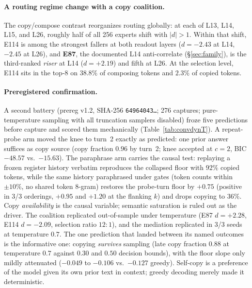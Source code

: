 \documentclass[10pt,a4paper,twocolumn]{article}
\begin{document}
\paragraph{A routing regime change with a copy coalition.}
The copy/compose contrast reorganizes routing globally: at each of L13, L14,
L15, and L26, roughly half of all 256 experts shift with $|d|{>}1$. Within that
shift, E114 is among the strongest fallers at both readout layers
($d{=}-2.43$ at L14, $-2.45$ at L26), and \textbf{E87}, the documented L14
anti-correlate (\S\ref{sec:family}), is the third-ranked \emph{riser} at L14 ($d{=}+2.19$) and
fifth at L26. At the selection level, E114 sits in the top-8 on $38.8\%$ of
composing tokens and $2.3\%$ of copied tokens.

\paragraph{Preregistered confirmation.}
A second battery (prereg v1.2, SHA-256 \texttt{64964043\ldots}; 276 captures;
pure-temperature sampling with all truncation samplers disabled) froze five
predictions before capture and scored them mechanically
(Table~\ref{tab:convdynT}). A repeat-probe arm moved the knee to turn~2 exactly
as predicted: one prior answer suffices as copy source (copy fraction $0.96$ by
turn~2; knee accepted at $c{=}2$, BIC $-48.57$ vs.\ $-15.63$). The paraphrase
arm carries the causal test: replaying a frozen register history verbatim
reproduces the collapsed floor with $92\%$ copied tokens, while the same
history paraphrased under gates (token counts within $\pm 10\%$, no shared
token 8-gram) restores the probe-turn floor by $+0.75$ (positive in 3/3
orderings, $+0.95$ and $+1.20$ at the flanking $k$) and drops copying to
$36\%$. Copy \emph{availability} is the causal variable; semantic saturation
is ruled out as the driver. The coalition replicated out-of-sample under
temperature (E87 $d{=}+2.28$, E114 $d{=}-2.09$, selection ratio $12{:}1$), and
the mediation replicated in 3/3 seeds at temperature $0.7$. The one prediction
that landed between its named outcomes is the informative one: copying
\emph{survives} sampling (late copy fraction $0.88$ at temperature $0.7$
against $0.30$ and $0.50$ decision bounds), with the floor slope only mildly
attenuated ($-0.049$ to $-0.106$ vs.\ $-0.127$ greedy). Self-copy is a
preference of the model given its own prior text in context; greedy decoding
merely made it deterministic.
\end{document}
